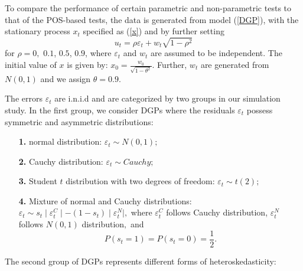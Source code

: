 \documentclass[harvard,11pt]{article}
\begin{document}
To compare the performance of certain parametric and non-parametric tests to that of the POS-based tests, the data is generated from model (\ref{DGP}), with the stationary process $x_t$ specified as (\ref{x}) and by further setting
\begin{equation}
u_{t}=\rho \varepsilon _{t}+w_{t}\sqrt{1-\rho ^{2}}  \label{error}
\end{equation}%
for $\rho =0,$ $0.1$, $0.5$, $0.9$, where $\varepsilon _{t}$ and $w_{t}$ are
assumed to be independent. The initial value of $x$ is given by: $x_{0}=%
\frac{w_{0}}{\sqrt{1-\theta ^{2}}}.$ Further, $w_{t}$ are generated from $%
N\left( 0,1\right)$ and we assign $\theta=0.9$. 

The errors $\varepsilon_t$ are i.n.i.d and are categorized by two groups in our simulation study. In the first group, we consider DGPs where the residuals $\varepsilon_t$ possess symmetric and asymmetric distributions:
\begin{enumerate}
\item[\textbf{1.}] normal distribution: $\varepsilon _{t}\sim N(0,1);$
\item[\textbf{2.}] Cauchy distribution: $\varepsilon _{t}\sim Cauchy;$
\item[\textbf{3.}] Student $t$ distribution with two degrees of freedom: $%
\varepsilon _{t}\sim t(2);$
\item[\textbf{4.}] Mixture of normal and Cauchy distributions: $%
\varepsilon _{t}\sim s_{t}\mid \varepsilon _{t}^{C}\mid -(1-s_{t})\mid
\varepsilon _{t}^{N}\mid ,$ where $\varepsilon _{t}^{C}$ follows Cauchy
distribution, $\varepsilon _{t}^{N}$ follows $N(0,1)$ distribution$,$ and 
\begin{equation*}
P\left( s_{t}=1\right) =P\left( s_{t}=0\right) =\frac{1}{2}%
.
\end{equation*}%
\end{enumerate}
The second group of DGPs represents different forms of heteroskedasticity:
\end{document}
